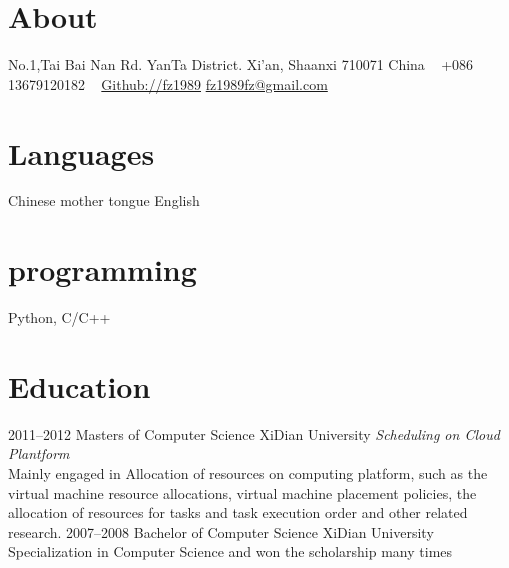 \documentclass[]{friggeri-cv} %
\begin{document}


\begin{aside} %
\section{About}
    No.1,Tai Bai Nan Rd.
    YanTa District.
    Xi'an, Shaanxi 710071
    China
    ~
    +086 13679120182
    ~
    \href{https://github.com/fz1989}{Github://fz1989}
    \href{mailto:fz1989fz@gmail.com}{fz1989fz@gmail.com}
\section{Languages}
Chinese mother tongue
English
\section{programming}
Python, C/C++
\end{aside}

\section{Education}

\begin{entrylist}
\entry
{2011--2012}
{Masters {\normalfont of Computer Science}}
{XiDian University}
{\emph{Scheduling on Cloud Plantform} \\Mainly engaged in Allocation of resources on computing platform, such as the virtual machine resource allocations, virtual machine placement policies, the allocation of resources for tasks and task execution order and other related research.}
\entry
{2007--2008}
{Bachelor {\normalfont of Computer Science}}
{XiDian University}
{Specialization in Computer Science and won the scholarship many times}
\end{entrylist}
\end{document}
